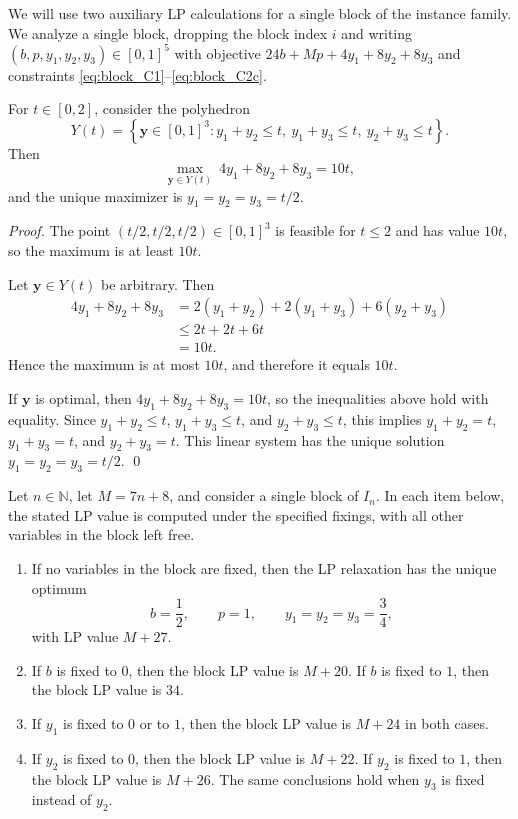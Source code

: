 \documentclass[smallextended,envcountsect]{svjour3} %
\newcommand{\N}{\mathbb{N}}
\newcommand{\set}[1]{\left\{#1\right\}}
\newcommand{\y}{\mathbf{y}}
\newcommand{\0}{\mathbf{0}}
\newcommand{\1}{\mathbf{1}} %
\begin{document}
We will use two auxiliary LP calculations for a single block of the instance family.
We analyze a single block, dropping the block index $i$ and writing
$(b,p,y_1,y_2,y_3)\in[0,1]^5$ with objective $24b+Mp+4y_1+8y_2+8y_3$ and constraints
\eqref{eq:block_C1}--\eqref{eq:block_C2c}.

\begin{lemma}\label{lem:triangle_pack}
	For $t\in[0,2]$, consider the polyhedron
	\[
		Y(t)=\set{\y\in[0,1]^3 : y_1+y_2\le t,\ y_1+y_3\le t,\ y_2+y_3\le t}.
	\]
	Then
	\[
		\max_{\y\in Y(t)}\ 4y_1+8y_2+8y_3=10t,
	\]
	and the unique maximizer is $y_1=y_2=y_3=t/2$.
\end{lemma}

\begin{proof}
	The point $(t/2,t/2,t/2)\in[0,1]^3$ is feasible for $t\le 2$ and has value $10t$, so the maximum
	is at least $10t$.

	Let $\y\in Y(t)$ be arbitrary. Then
	\begin{align*}
		4y_1+8y_2+8y_3
		 & =2(y_1+y_2)+2(y_1+y_3)+6(y_2+y_3) \\
		 & \le 2t+2t+6t                      \\
		 & =10t.
	\end{align*}
	Hence the maximum is at most $10t$, and therefore it equals $10t$.

	If $\y$ is optimal, then $4y_1+8y_2+8y_3=10t$, so the inequalities above hold with equality.
	Since $y_1+y_2\le t$, $y_1+y_3\le t$, and $y_2+y_3\le t$, this implies
	$y_1+y_2=t$, $y_1+y_3=t$, and $y_2+y_3=t$.
	This linear system has the unique solution $y_1=y_2=y_3=t/2$.
\qed
\end{proof}

\begin{lemma}\label{lem:block_values}
	Let $n\in\N$, let $M=7n+8$, and consider a single block of $I_n$.
	In each item below, the stated LP value is computed under the specified fixings, with all other variables in the block left free.
	\begin{enumerate}
		\item If no variables in the block are fixed, then the LP relaxation has the unique optimum
		      \[
			      b=\frac12,\qquad p=1,\qquad y_1=y_2=y_3=\frac34,
		      \]
		      with LP value $M+27$.
		\item If $b$ is fixed to $0$, then the block LP value is $M+20$.
		      If $b$ is fixed to $1$, then the block LP value is $34$.
		\item If $y_1$ is fixed to $0$ or to $1$, then the block LP value is $M+24$ in both cases.
		\item If $y_2$ is fixed to $0$, then the block LP value is $M+22$.
		      If $y_2$ is fixed to $1$, then the block LP value is $M+26$.
		      The same conclusions hold when $y_3$ is fixed instead of $y_2$.
	\end{enumerate}
\end{lemma}
\end{document}
